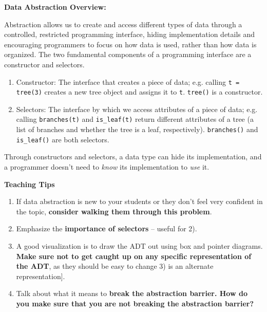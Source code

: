 \textbf{Data Abstraction Overview:}

Abstraction allows us to create and access different types of data through a controlled, restricted programming interface, hiding implementation details and encouraging programmers to focus on how data is used, rather than how data is organized. The two fundamental components of a programming interface are a constructor and selectors.
\begin{enumerate}
	\item Constructor: The interface that creates a piece of data; e.g. calling \texttt{t = tree(3)} creates a new tree object and assigns it to \texttt{t}. \texttt{tree()} is a constructor.
	\item Selectors: The interface by which we access attributes of a piece of data; e.g. calling \texttt{branches(t)} and \texttt{is\_leaf(t)} return different attributes of a tree (a list of branches and whether the tree is a leaf, respectively). \texttt{branches()} and \texttt{is\_leaf()} are both selectors.
\end{enumerate}

Through constructors and selectors, a data type can hide its implementation, and a programmer doesn’t need to {\it know} its implementation to {\it use} it.

\begin{blocksection}
	\begin{guide}
	\textbf{Teaching Tips}
	\begin{enumerate}
		\item If data abstraction is new to your students or they don’t feel very confident in the topic, \textbf{consider walking them through this problem}.
        \item Emphasize the \textbf{importance of selectors} -- useful for 2).
        \item A good visualization is to draw the ADT out using box and pointer diagrams. \textbf{Make sure not to get caught up on any specific representation of the ADT}, as they should be easy to change 3) is an alternate representation].
        \item Talk about what it means to \textbf{break the abstraction barrier. How do you make sure that you are not breaking the abstraction barrier?}
	\end{enumerate}
	\end{guide}
\end{blocksection}